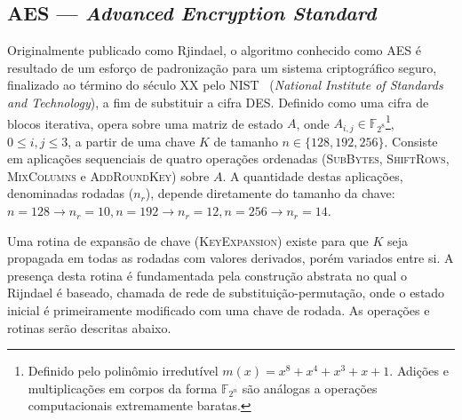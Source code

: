 \documentclass[12pt]{report}
\begin{document}
\subsection{AES --- \emph{Advanced Encryption Standard}}

Originalmente publicado como Rjindael, o algoritmo conhecido como AES é resultado
de um esforço de padronização para um sistema criptográfico seguro, finalizado
ao término do século XX pelo NIST~\cite{Standards2001} (\emph{National Institute
of Standards and Technology}), a fim de substituir a cifra DES.
Definido como uma cifra de blocos iterativa, opera
sobre uma matriz de estado $A$, onde $A_{i,j} \in 
\mathbb{F}_{2^{8}}$\footnote{Definido pelo polinômio irredutível
$m(x) = x^{8} + x^{4} + x^{3} + x + 1$. Adições e multiplicações em corpos da
forma $\mathbb{F}_{2^n}$ são análogas a operações computacionais extremamente
baratas.}, $0 \leq i, j \leq 3$, a partir de uma chave $K$ de tamanho $n \in \{128, 192,
256\}$. Consiste em aplicações sequenciais de quatro operações ordenadas
(\textsc{SubBytes}, \textsc{ShiftRows}, \textsc{MixColumns} e
\textsc{AddRoundKey}) sobre $A$. A quantidade destas aplicações, denominadas
rodadas ($n_r$), depende diretamente do tamanho da chave: $n = 128 \rightarrow
n_r = 10, n = 192 \rightarrow n_r = 12, n = 256 \rightarrow n_r = 14$.

Uma rotina de expansão de chave (\textsc{KeyExpansion}) existe
para que $K$ seja propagada em todas as rodadas com valores derivados,
porém variados entre si. A presença desta rotina é fundamentada pela
construção abstrata no qual o Rijndael é baseado, chamada de rede de
substituição-permutação, onde o estado inicial é primeiramente modificado
com uma chave de rodada. As operações e rotinas serão descritas abaixo.
\end{document}
